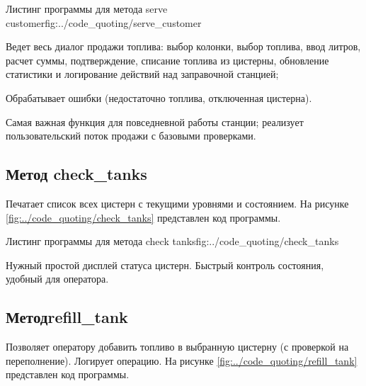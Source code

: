 \documentclass{vvsu}
\begin{document}
\begin{vvsu_figure}{Листинг программы для метода serve customer}{fig:../code_quoting/serve_customer}
  \begin{minipage}{.75\textwidth}
    
  \end{minipage}
\end{vvsu_figure}

\begin{vvsu_itemize}
  \item Ведет весь диалог продажи топлива: выбор колонки, выбор топлива, ввод литров, расчет суммы, подтверждение, списание топлива из цистерны, обновление статистики и логирование действий над заправочной станцией;
  \item Обрабатывает ошибки (недостаточно топлива, отключенная цистерна).
\end{vvsu_itemize}

  Самая важная функция для повседневной работы станции; реализует пользовательский поток продажи с базовыми проверками.

  
\subsection{Метод check\_tanks}
  Печатает список всех цистерн с текущими уровнями и состоянием.
  На рисунке \ref{fig:../code_quoting/check_tanks} представлен код программы.

\begin{vvsu_figure}{Листинг программы для метода check tanks}{fig:../code_quoting/check_tanks}
  \begin{minipage}{.75\textwidth}
    
  \end{minipage}
\end{vvsu_figure}

  Нужный простой дисплей статуса цистерн. Быстрый контроль состояния, удобный для оператора.


\subsection{Методrefill\_tank}
  Позволяет оператору добавить топливо в выбранную цистерну (с проверкой на переполнение). Логирует операцию.
  На рисунке \ref{fig:../code_quoting/refill_tank} представлен код программы.
\end{document}
